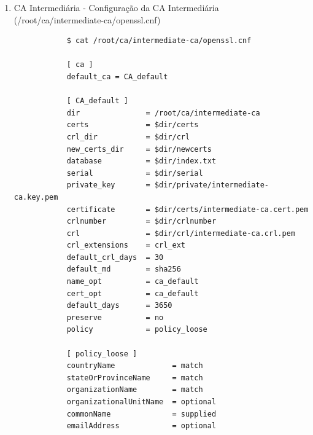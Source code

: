 \begin{enumerate}
\begin{tcolorbox}[width=\textwidth, enhanced, breakable]
{\begin{verbatim}
			[ req_distinguished_name ]
			countryName                     = BR
			stateOrProvinceName             = Sao Paulo
			localityName                    = Sao Paulo
			0.organizationName              = senhasegura
			organizationalUnitName          = IT Department
			commonName                      = My Root CA
			emailAddress                    = mt4@senhasegura.com
			
			[ v3_ca ]
			subjectKeyIdentifier = hash
			authorityKeyIdentifier = keyid:always,issuer
			basicConstraints = critical,CA:true
			keyUsage = critical, digitalSignature, cRLSign, keyCertSign
			
			[ v3_intermediate_ca ]
			subjectKeyIdentifier = hash
			authorityKeyIdentifier = keyid:always,issuer
			basicConstraints = critical,CA:true,pathlen:0
			keyUsage = critical, digitalSignature, cRLSign, keyCertSign
			
			[ crl_ext ]
			authorityKeyIdentifier=keyid:always
		\end{verbatim}
	}
	\end{tcolorbox}

	\item CA Intermediária - Configuração da CA Intermediária (/root/ca/intermediate-ca/openssl.cnf)
	\begin{tcolorbox}[width=\textwidth, enhanced, breakable]
	{\footnotesize
		\begin{verbatim}
			$ cat /root/ca/intermediate-ca/openssl.cnf

			[ ca ]
			default_ca = CA_default
			
			[ CA_default ]
			dir               = /root/ca/intermediate-ca
			certs             = $dir/certs
			crl_dir           = $dir/crl
			new_certs_dir     = $dir/newcerts
			database          = $dir/index.txt
			serial            = $dir/serial
			private_key       = $dir/private/intermediate-ca.key.pem
			certificate       = $dir/certs/intermediate-ca.cert.pem
			crlnumber         = $dir/crlnumber
			crl               = $dir/crl/intermediate-ca.crl.pem
			crl_extensions    = crl_ext
			default_crl_days  = 30
			default_md        = sha256
			name_opt          = ca_default
			cert_opt          = ca_default
			default_days      = 3650
			preserve          = no
			policy            = policy_loose
			
			[ policy_loose ]
			countryName             = match
			stateOrProvinceName     = match
			organizationName        = match
			organizationalUnitName  = optional
			commonName              = supplied
			emailAddress            = optional
			

\end{verbatim}}
\end{tcolorbox}
\end{enumerate}
